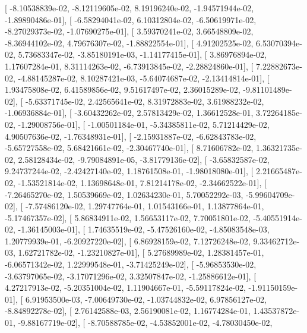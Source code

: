 \documentclass{article}
\begin{document}
       [ -8.10538839e-02,  -8.12119605e-02,   8.19196240e-02,
         -1.94571944e-02,  -1.89890486e-01],
       [ -6.58294041e-02,   6.10312804e-02,  -6.50619971e-02,
         -8.27029373e-02,  -1.07690275e-01],
       [  3.59370241e-02,   3.66548809e-02,  -8.36944102e-02,
          4.79676307e-02,  -1.88822554e-01],
       [  4.91202525e-02,   6.53070394e-02,   5.73683347e-02,
         -3.85180191e-03,  -1.14177415e-01],
       [  3.86976894e-02,   1.17607284e-01,   8.31114263e-02,
         -6.73913845e-02,  -2.28824860e-01],
       [  7.22882673e-02,  -4.88145287e-02,   8.10287421e-03,
         -5.64074687e-02,  -2.13414814e-01],
       [  1.93475808e-02,   6.41589856e-02,   9.51617497e-02,
          2.36015289e-02,  -9.81101489e-02],
       [ -5.63371745e-02,   2.42565641e-02,   8.31972883e-02,
          3.61988232e-02,  -1.06936884e-01],
       [ -3.60432262e-02,   2.57813429e-02,   1.36612528e-01,
          3.72264185e-02,  -1.29008756e-01],
       [ -1.00501184e-01,  -5.34385811e-02,   5.71214429e-02,
          4.90507636e-02,  -1.76348931e-01],
       [ -2.15931887e-02,  -6.62843783e-02,  -5.65727558e-02,
          5.68421661e-02,  -2.30467740e-01],
       [  8.71606782e-02,   1.36321735e-02,   2.58128434e-02,
         -9.79084891e-05,  -3.81779136e-02],
       [ -3.65832587e-02,   9.24737244e-02,  -2.42427140e-02,
          1.18761508e-01,  -1.98018080e-01],
       [  2.21665487e-02,  -1.53521814e-02,   1.13698648e-01,
          7.81214178e-02,  -2.34662522e-01],
       [ -7.26465270e-02,   1.50539669e-02,   1.02634230e-01,
          5.70052292e-03,  -5.99604709e-02],
       [ -7.57486120e-02,   1.29747764e-01,   1.01543166e-01,
          1.13877864e-01,  -5.17467357e-02],
       [  5.86834911e-02,   1.56653117e-02,   7.70051801e-02,
         -5.40551914e-02,  -1.36145003e-01],
       [  1.74635519e-02,  -5.47526160e-02,  -4.85083548e-03,
          1.20779939e-01,  -6.20927220e-02],
       [  6.86928159e-02,   7.12726248e-02,   9.33462712e-03,
          1.62721782e-02,  -1.23210827e-01],
       [  5.27689989e-02,   1.28381457e-01,  -6.06571342e-02,
          1.22999548e-01,  -3.71425249e-02],
       [ -5.96853530e-02,  -3.63797065e-02,  -3.17071296e-02,
          3.32507847e-02,  -1.25886612e-01],
       [  4.27217913e-02,  -5.20351004e-02,   1.11904667e-01,
         -5.59117824e-02,  -1.91150159e-01],
       [  6.91953500e-03,  -7.00649730e-02,  -1.03744832e-02,
          6.97856127e-02,  -8.84892278e-02],
       [  2.76142588e-03,   2.56190081e-02,   1.16774284e-01,
          1.43537872e-01,  -9.88167719e-02],
       [ -8.70588785e-02,  -4.53852001e-02,  -4.78030450e-02,
\end{document}
